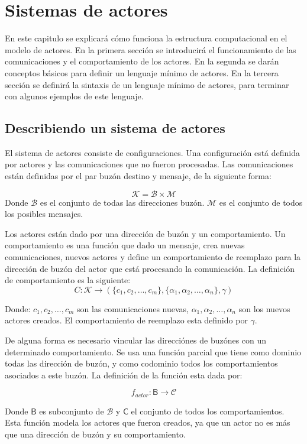 \chapter{Sistemas de actores}

En este capitulo se explicará cómo funciona la estructura computacional en el modelo de actores. En la primera sección se introducirá el funcionamiento de las comunicaciones y el comportamiento de los actores. En la segunda se darán conceptos básicos para definir un lenguaje mínimo de actores. En la tercera sección se definirá la sintaxis de un lenguaje mínimo de actores, para terminar con algunos ejemplos de este lenguaje.

\section{Describiendo un sistema de actores}
El sistema de actores consiste de configuraciones. Una configuración está definida por actores y las comunicaciones que no fueron procesadas. Las comunicaciones están definidas por el par buzón destino y mensaje, de la siguiente forma:

\[
\mathcal{K} = \mathcal{B} \times \mathcal{M}
\]
Donde $\mathcal{B}$ es el conjunto de todas las direcciones buzón. $\mathcal{M}$ es el conjunto de todos los posibles mensajes. 

Los actores están dado por una dirección de buzón y un comportamiento. Un comportamiento es una función que dado un mensaje, crea nuevas comunicaciones, nuevos actores y define un comportamiento de reemplazo para la dirección de buzón del actor que está procesando la comunicación. La definición de comportamiento es la siguiente:
\[
C : \mathcal{K} \rightarrow ( \{ c_1, c_2, \ldots, c_m \}, \{ \alpha_1, \alpha_2, \ldots, \alpha_n \}, \gamma )
\]

Donde: $c_1, c_2, \ldots, c_m$ son las comunicaciones nuevas, $\alpha_1, \alpha_2, \ldots, \alpha_n$ son los nuevos actores creados. El comportamiento de reemplazo esta definido por $\gamma$.

De alguna forma es necesario vincular las direcciónes de buzónes con un determinado comportamiento. Se usa una función parcial que tiene como dominio todas las dirección de buzón, y como codominio todos los comportamientos asociados a este buzón. La definición de la función esta dada por:

\[
f_{actor} : \mathsf{B} \rightarrow  \mathcal{C}
\]

Donde $\mathsf{B}$ es subconjunto de $\mathcal{B}$ y $\mathsf{C}$ el conjunto de todos los comportamientos. Esta función modela los actores que fueron creados, ya que un actor no es más que una dirección de buzón y su comportamiento.

